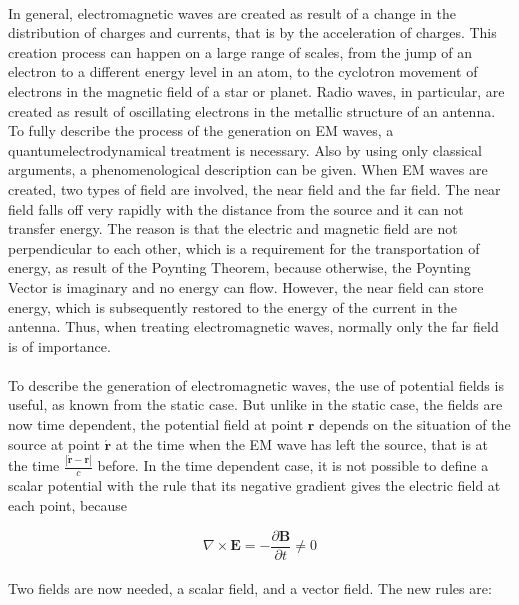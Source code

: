 \documentclass[a4paper,10pt]{thesis}
\begin{document}
\paragraph*{}
In general, electromagnetic waves are created as result of a change in the distribution of charges and currents, that is by the acceleration of charges. This creation process can happen on a large range of scales, from the jump of an electron to a different energy level in an atom, to the cyclotron movement of electrons in the magnetic field of a star or planet. Radio waves, in particular, are created as result of oscillating electrons in the metallic structure of an antenna. To fully describe the process of the generation on EM waves, a quantumelectrodynamical treatment is necessary. Also by using only classical arguments, a phenomenological description can be given. When EM waves are created, two types of field are involved, the near field and the far field. The near field falls off very rapidly with the distance from the source and it can not transfer energy. The reason is that the electric and magnetic field are not perpendicular to each other, which is a requirement for the transportation of energy, as result of the Poynting Theorem, because otherwise, the Poynting Vector is imaginary and no energy can flow. However, the near field can store energy, which is subsequently restored to the energy of the current in the antenna. Thus, when treating electromagnetic waves, normally only the far field is of importance.

\paragraph*{}
To describe the generation of electromagnetic waves, the use of potential fields is useful, as known from the static case. But unlike in the static case, the fields are now time dependent, the potential field at point $\mathbf{r}$ depends on the situation of the source at point $\mathbf{\acute{r}}$ at the time when the EM wave has left the source, that is at the time $\frac{|\mathbf{\acute{r}}-\mathbf{r}|}{c}$ before. In the time dependent case, it is not possible to define a scalar potential with the rule that its negative gradient gives the electric field at each point, because

\begin{equation}
\nabla \times \mathbf{E}=-\frac{\partial \mathbf{B}}{\partial t}\neq 0
\end{equation}
\paragraph*{}
 Two fields are now needed, a scalar field, and a vector field. The new rules are:
\end{document}
